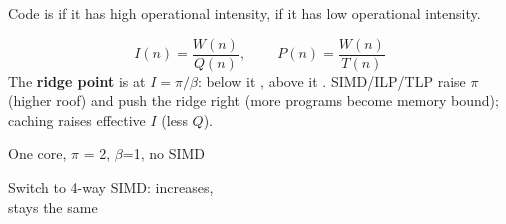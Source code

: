 \begin{minipage}[t]{0.44\linewidth}
    \vspace*{0pt}
    Code is  if it has high operational intensity,  if it has low operational intensity.
    
    \[\boxed{
    I(n) = \frac{W(n)}{Q(n)}, \qquad
    \ P(n) = \frac{W(n)}{T(n)} 
    }\]
    The \textbf{ridge point} is at $I=\pi/\beta$: below it , above it . 
    SIMD/ILP/TLP raise $\pi$ (higher roof) and push the ridge right (more programs become memory bound); caching raises effective $I$ (less $Q$).
\end{minipage}\hfill
\begin{minipage}[t]{0.55\linewidth}
    \vspace*{0pt}
    \hspace{1cm}One core, $\pi$ = 2, $\beta$=1, no SIMD

    

    {
    \color{olive!70} Switch to 4-way SIMD:
    }
     increases, \\  stays the same
\end{minipage}



